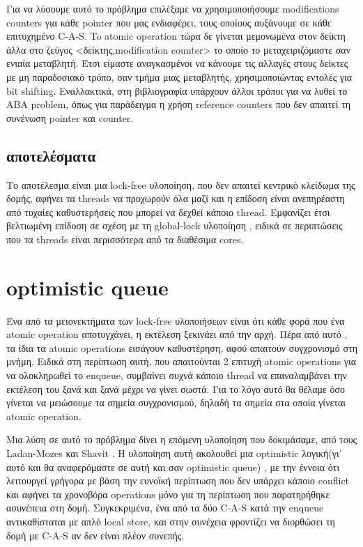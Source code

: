 Για να λύσουμε αυτό το πρόβλημα επιλέξαμε να χρησιμοποιήσουμε \textlatin{modifications counters} για κάθε \textlatin{pointer} που μας ενδιαφέρει, τους οποίους αυξάνουμε σε κάθε επιτυχημένο \textlatin{C-A-S}. To \textlatin{atomic operation} τώρα δε γίνεται μεμονωμένα στον δείκτη άλλα στο ζεύγος <δείκτης,\textlatin{modification counter}> το οποίο το μεταχειριζόμαστε σαν ενιαία μεταβλητή. Έτσι είμαστε αναγκασμένοι να κάνουμε τις αλλαγές στους δείκτες με μη παραδοσιακό τρόπο, σαν τμήμα μιας μεταβλητής, χρησιμοποιώντας εντολές για \textlatin{bit shifting}. Εναλλακτικά, στη βιβλιογραφία υπάρχουν άλλοι τρόποι για να λυθεί το ABA \textlatin{problem}, όπως για παράδειγμα η χρήση \textlatin{reference counters} που δεν απαιτεί τη συνένωση \textlatin{pointer} και \textlatin{counter}.

\subsection{αποτελέσματα}
Το αποτέλεσμα είναι μια \textlatin{lock-free} υλοποίηση, που δεν απαιτεί κεντρικό κλείδωμα της δομής, αφήνει τα \textlatin{threads} να προχωρούν όλα μαζί και η επίδοση είναι ανεπηρέαστη από τυχαίες  καθυστερήσεις που μπορεί να δεχθεί κάποιο \textlatin{thread}. Εμφανίζει έτσι βελτιωμένη επίδοση σε σχέση με τη \textlatin{global-lock} υλοποίηση , ειδικά σε περιπτώσεις που τα \textlatin{threads} είναι περισσότερα από τα διαθέσιμα \textlatin{cores}.



\section{\textlatin{optimistic queue}}

Ένα από τα μειονεκτήματα των \textlatin{lock-free} υλοποιήσεων είναι ότι κάθε φορά που ένα \textlatin{atomic operation} αποτυγχάνει, η εκτέλεση ξεκινάει από την αρχή. Πέρα από αυτό , τα ίδια τα \textlatin{atomic operations} εισάγουν καθυστέρηση, αφού απαιτούν συγχρονισμό στη μνήμη. Ειδικά στη περίπτωση αυτή, που απαιτούνται 2 επιτυχή \textlatin{atomic operations} για να ολοκληρωθεί το \textlatin{enqueue}, συμβαίνει συχνά κάποιο \textlatin{thread} να επαναλαμβάνει την εκτέλεση του ξανά και ξανά μέχρι να γίνει σωστά. Για το λόγο αυτό θα θέλαμε όσο γίνεται να  μειώσουμε τα σημεία συγχρονισμού, δηλαδή τα σημεία στα οποία γίνεται \textlatin{atomic operation}.

Μια λύση σε αυτό το πρόβλημα δίνει η επόμενη υλοποίηση που δοκιμάσαμε, από τους \textlatin{Ladan-Mozes} και \textlatin{Shavit} \cite{optimistic}. H υλοποίηση αυτή ακολουθεί μια \textlatin{optimistic} λογική(γι’ αυτό και θα αναφερόμαστε σε αυτή και σαν \textlatin{optimistic queue}) , με την έννοια ότι λειτουργεί γρήγορα με βάση την ευνοϊκή περίπτωση που δεν υπάρχει κάποιο \textlatin{conflict} και αφήνει τα χρονοβόρα operations μόνο για τη περίπτωση που παρατηρήθηκε ασυνέπεια στη δομή. Συγκεκριμένα, ένα από τα δύο \textlatin{C-A-S} κατά την \textlatin{enqueue} αντικαθίσταται  με απλό \textlatin{local store}, και στην συνέχεια φροντίζει να διορθώσει τη δομή με \textlatin{C-A-S} αν δεν είναι πλέον συνεπής.

